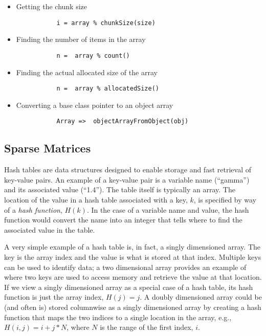 \documentclass[9pt]{article}
\begin{document}
\begin{itemize}
        \item Getting the chunk size
	{\color{blue}\begin{verbatim}
           i = array % chunkSize(size)
	\end{verbatim}}
	
        \item Finding the number of items in the array
	{\color{blue}\begin{verbatim}
           n =  array % count()
	\end{verbatim}}
	
        \item Finding the actual allocated size of the array
	{\color{blue}\begin{verbatim}
           n =  array % allocatedSize()
	\end{verbatim}}
	
        \item Converting a base class pointer to an object array 
	{\color{blue}\begin{verbatim}
           Array =>  objectArrayFromObject(obj)
	\end{verbatim}}
	
\end{itemize}

\subsection{Sparse Matrices}
Hash tables are data structures designed to enable storage and fast
retrieval of key-value pairs. An example of a key-value pair is
a variable name (``gamma'') and its associated value (``1.4'').
The table itself is typically an array.
The location of the value in a hash table associated with
a key, $k$, is specified by way of a \emph{hash function}, $H(k)$.
In the case of a variable name and value, the hash function
would convert the name into an integer that tells where to
find the associated value in the table.

A very simple example of a
hash table is, in fact, a singly dimensioned array. The key is 
the array index and the value is what is stored at that index.
Multiple keys can be used to identify data; a two dimensional
array provides an example of where two keys are used to access memory
and retrieve the value at that location.
If we view a singly dimensioned array as a special case of a hash table,
its hash function is just the array index, $H(j)=j$. A doubly dimensioned array
could be (and often is) stored columnwise as a singly dimensioned array by creating a hash
function that maps the two indices to a single location in the array, e.g.,
$H(i,j) = i + j*N$, where $N$ is the range of the first index, $i$. 
\end{document}
